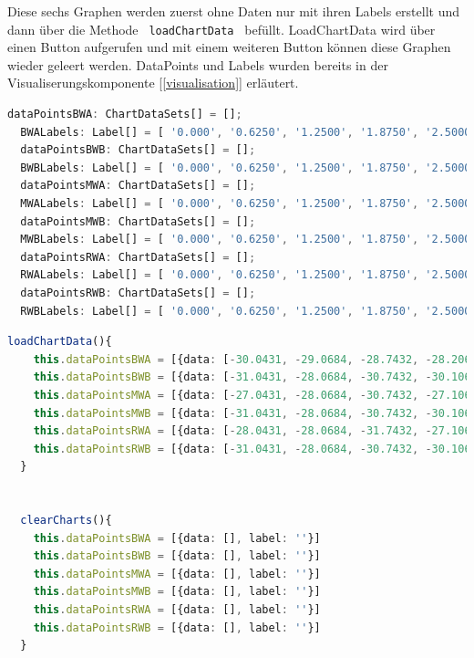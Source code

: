 Diese sechs Graphen werden zuerst ohne Daten nur mit ihren Labels erstellt und dann über die Methode \lstinline | loadChartData | befüllt.
LoadChartData wird über einen Button aufgerufen und mit einem weiteren Button können diese Graphen wieder geleert werden.
DataPoints und Labels wurden bereits in der Visualiserungskomponente [\ref{visualisation}] erläutert.
\begin{lstlisting}[language=Typescript, caption={Erstellen der Funktionsgraphen}]
  dataPointsBWA: ChartDataSets[] = [];
  BWALabels: Label[] = [ '0.000', '0.6250', '1.2500', '1.8750', '2.5000', '3.1250', '3.7500', '4.3750'];
  dataPointsBWB: ChartDataSets[] = [];
  BWBLabels: Label[] = [ '0.000', '0.6250', '1.2500', '1.8750', '2.5000', '3.1250', '3.7500', '4.3750'];
  dataPointsMWA: ChartDataSets[] = [];
  MWALabels: Label[] = [ '0.000', '0.6250', '1.2500', '1.8750', '2.5000', '3.1250', '3.7500', '4.3750'];
  dataPointsMWB: ChartDataSets[] = [];
  MWBLabels: Label[] = [ '0.000', '0.6250', '1.2500', '1.8750', '2.5000', '3.1250', '3.7500', '4.3750'];
  dataPointsRWA: ChartDataSets[] = [];
  RWALabels: Label[] = [ '0.000', '0.6250', '1.2500', '1.8750', '2.5000', '3.1250', '3.7500', '4.3750'];
  dataPointsRWB: ChartDataSets[] = [];
  RWBLabels: Label[] = [ '0.000', '0.6250', '1.2500', '1.8750', '2.5000', '3.1250', '3.7500', '4.3750'];
\end{lstlisting}

\begin{lstlisting}[language=Typescript, caption={Befüllen und Leeren der Funktionsgraphen}]
  loadChartData(){
    this.dataPointsBWA = [{data: [-30.0431, -29.0684, -28.7432, -28.2064, -27.8274, -27.9592, -25.7714, -28.1736], label: 'Lager Bremswelle A'}]
    this.dataPointsBWB = [{data: [-31.0431, -28.0684, -30.7432, -30.1064, -28.8274, -31.9592, -24.7714, -30.1736], label: 'Lager Bremswelle B'}]
    this.dataPointsMWA = [{data: [-27.0431, -28.0684, -30.7432, -27.1064, -30.8274, -29.9592, -24.7714, -31.1736], label: 'Lager Motorwelle A'}]
    this.dataPointsMWB = [{data: [-31.0431, -28.0684, -30.7432, -30.1064, -27.8274, -24.9592, -24.7714, -25.1736], label: 'Lager Motorwelle B'}]
    this.dataPointsRWA = [{data: [-28.0431, -28.0684, -31.7432, -27.1064, -24.8274, -29.9592, -24.7714, -30.1736], label: 'Lager Radwelle A'}]
    this.dataPointsRWB = [{data: [-31.0431, -28.0684, -30.7432, -30.1064, -27.8274, -30.9592, -28.7714, -25.1736], label: 'Lager Radwelle B'}]
  }


  clearCharts(){
    this.dataPointsBWA = [{data: [], label: ''}]
    this.dataPointsBWB = [{data: [], label: ''}]
    this.dataPointsMWA = [{data: [], label: ''}]
    this.dataPointsMWB = [{data: [], label: ''}]
    this.dataPointsRWA = [{data: [], label: ''}]
    this.dataPointsRWB = [{data: [], label: ''}]
  }
\end{lstlisting}

